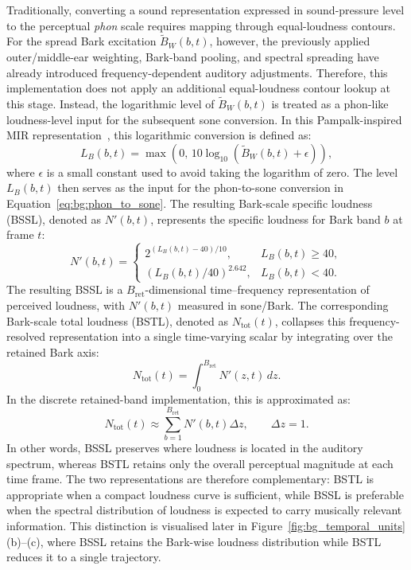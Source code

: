 Traditionally, converting a sound representation expressed in sound-pressure level to the perceptual \emph{phon} scale requires mapping through equal-loudness contours. For the spread Bark excitation $\widetilde{B}_W(b,t)$, however, the previously applied outer/middle-ear weighting, Bark-band pooling, and spectral spreading have already introduced frequency-dependent auditory adjustments. Therefore, this implementation does not apply an additional equal-loudness contour lookup at this stage. Instead, the logarithmic level of $\widetilde{B}_W(b,t)$ is treated as a phon-like loudness-level input for the subsequent sone conversion. In this Pampalk-inspired MIR representation~\cite{pampalk2002content,pampalk2004exploring,pampalk2004toolbox}, this logarithmic conversion is defined as:
\begin{equation}
L_B(b,t)=\max\!\left(0,\,10\log_{10}\!\left(\widetilde{B}_W(b,t)+\epsilon\right)\right),
\label{eq:bg:spread_bark_level}
\end{equation}
where $\epsilon$ is a small constant used to avoid taking the logarithm of zero. The level $L_B(b,t)$ then serves as the input for the phon-to-sone conversion in Equation~\eqref{eq:bg:phon_to_sone}. The resulting Bark-scale specific loudness (BSSL), denoted as $N'(b,t)$, represents the specific loudness for Bark band $b$ at frame $t$:
\begin{equation}
N'(b,t)=
\begin{cases}
2^{(L_B(b,t)-40)/10}, & L_B(b,t)\ge40,\\[4pt]
(L_B(b,t)/40)^{2.642}, & L_B(b,t)<40.
\end{cases}
\label{eq:bg:bssl}
\end{equation}
The resulting BSSL is a $B_{\mathrm{ret}}$-dimensional time--frequency representation of perceived loudness, with $N'(b,t)$ measured in sone/Bark. The corresponding Bark-scale total loudness (BSTL), denoted as $N_{\mathrm{tot}}(t)$, collapses this frequency-resolved representation into a single time-varying scalar by integrating over the retained Bark axis:
\begin{equation}
N_{\mathrm{tot}}(t)=\int_{0}^{B_{\mathrm{ret}}} N'(z,t)\,dz.
\label{eq:bg:total_loudness_cont}
\end{equation}
In the discrete retained-band implementation, this is approximated as:
\begin{equation}
N_{\mathrm{tot}}(t)\approx \sum_{b=1}^{B_{\mathrm{ret}}} N'(b,t)\Delta z,
\qquad \Delta z = 1.
\label{eq:bg:total_loudness_discrete}
\end{equation}
In other words, BSSL preserves where loudness is located in the auditory spectrum, whereas BSTL retains only the overall perceptual magnitude at each time frame. The two representations are therefore complementary: BSTL is appropriate when a compact loudness curve is sufficient, while BSSL is preferable when the spectral distribution of loudness is expected to carry musically relevant information. This distinction is visualised later in Figure~\ref{fig:bg_temporal_units}(b)--(c), where BSSL retains the Bark-wise loudness distribution while BSTL reduces it to a single trajectory.

